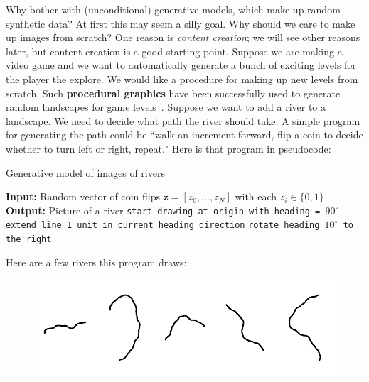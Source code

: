 Why bother with (unconditional) generative models, which make up random synthetic data? At first this may seem a silly goal. Why should we care to make up images from scratch? One reason is \emph{content creation}; we will see other reasons later, but content creation is a good starting point. Suppose we are making a video game and we want to automatically generate a bunch of exciting levels for the player the explore. We would like a procedure for making up new levels from scratch. Such {\bf procedural graphics} have been successfully used to generate random landscapes for game levels~\cite{XX}. Suppose we want to add a river to a landscape. We need to decide what path the river should take. A simple program for generating the path could be ``walk an increment forward, flip a coin to decide whether to turn left or right, repeat." Here is that program in pseudocode:

\begin{algorithm}[h]
\label{finetuning_two_stage}
\SetAlgoVlined
\DontPrintSemicolon
\caption{Generative model of images of rivers}
{\bf Input:} Random vector of coin flips $\mathbf{z} = [z_0, \ldots, z_N]$ with each $z_i \in \{0,1\}$\;
{\bf Output:} Picture of a river\;
\texttt{start drawing at origin with heading = $90^\circ$}\;
 {
    \texttt{extend line 1 unit in current heading direction}\;
     {
        \texttt{rotate heading $10^\circ$ to the right}
    }
}
\end{algorithm}

Here are a few rivers this program draws:
\begin{figure}[h]
    \centering
    \includegraphics[width=0.8\linewidth]{./figures/generative_models/G4_river.pdf}
    \label{fig:generative_models:rivers1}
\end{figure}

